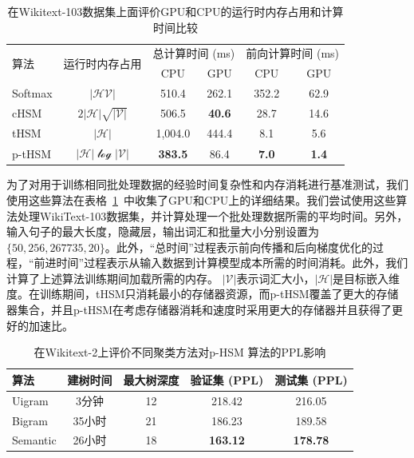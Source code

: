 \begin{table}[!ht]
  \centering
  \caption{在Wikitext-103数据集上面评价GPU和CPU的运行时内存占用和计算时间比较\label{tab:time}}
\begin{tabular}{lccccc}
  \toprule
 \multirow{2}{*}{算法}  &\multirow{2}{*}{运行时内存占用} &\multicolumn{2}{c}{总计算时间 (ms)} & \multicolumn{2}{c}{前向计算时间 (ms)}   \\
   \cmidrule(lr){3-4}  \cmidrule(lr){5-6}
	& & CPU&GPU & CPU& GPU \\ \midrule
Softmax & $\mathcal{|HV|}$ &510.4  &262.1&352.2& 62.9 \\
cHSM    & $2\mathcal{|H|\sqrt{|V|}}$&506.5  &\textbf{40.6}&28.7&14.6 \\
tHSM    &$\mathcal{|H|}$&1,004.0 &444.4 & 8.1&  5.6   \\
p-tHSM  &$\mathcal{|H|\log{|V|}}$ &\textbf{383.5}&	86.4 &\textbf{7.0}&	\textbf{1.4} \\
  \bottomrule
\end{tabular}
\end{table}


为了对用于训练相同批处理数据的经验时间复杂性和内存消耗进行基准测试，我们使用这些算法在表格~\ref{tab:time}~中收集了GPU和CPU上的详细结果。我们尝试使用这些算法处理WikiText-103数据集，并计算处理一个批处理数据所需的平均时间。另外，输入句子的最大长度，隐藏层，输出词汇和批量大小分别设置为$\{50, 256, 267735, 20\}$。此外，“总时间”过程表示前向传播和后向梯度优化的过程，“前进时间”过程表示从输入数据到计算模型成本所需的时间消耗。此外，我们计算了上述算法训练期间加载所需的内存。 $ \mathcal{| V |} $表示词汇大小，$ \mathcal{| H |} $是目标嵌入维度。在训练期间，tHSM只消耗最小的存储器资源，而p-tHSM覆盖了更大的存储器集合，并且p-tHSM在考虑存储器消耗和速度时采用更大的存储器并且获得了更好的加速比。

\begin{table}[!ht]
  \centering
   \caption{在Wikitext-2上评价不同聚类方法对p-HSM 算法的PPL影响\label{table:p-thsm}}
  \begin{tabular}{lcccc} \toprule
  算法  &建树时间&最大树深度 &验证集 (PPL) & 测试集 (PPL)  \\ \midrule
  Uigram  &3分钟&12 &218.42& 216.05     \\
  Bigram  &35小时&21& 186.23& 189.58\\
  Semantic &26小时 &18& \textbf{163.12} & \textbf{178.78}\\
\bottomrule
  \end{tabular}
\end{table}

